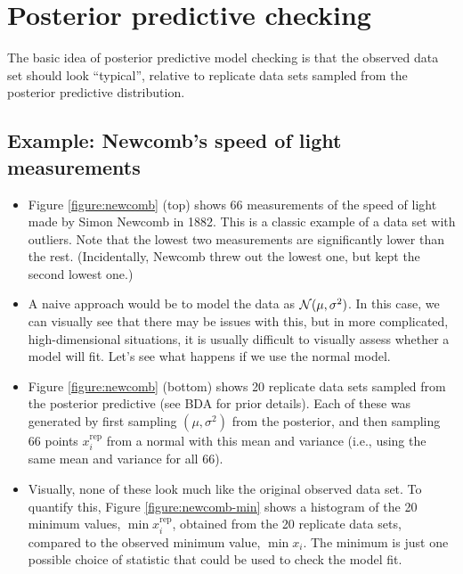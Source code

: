\documentclass[12pt]{article}
\begin{document}
\section{Posterior predictive checking}

The basic idea of  posterior predictive model checking is that the observed data set should look ``typical'', relative to replicate data sets sampled from the posterior predictive distribution.

\subsection*{Example: Newcomb's speed of light measurements}
\begin{itemize}
\item Figure \ref{figure:newcomb} (top) shows  66 measurements of the speed of light made by Simon Newcomb in 1882. This is a classic example of a data set with outliers. Note that the lowest two measurements are significantly lower than the rest. (Incidentally, Newcomb threw out the lowest one, but kept the second lowest one.)
\item A naive approach would be to model the data as $\mathcal{N}(\mu,\sigma^2)$. In this case, we can visually see that there may be issues with this, but in more complicated, high-dimensional situations, it is usually difficult to visually assess whether a model will fit. Let's see what happens if we use the normal model.
\item Figure \ref{figure:newcomb} (bottom) shows 20 replicate data sets sampled from the posterior predictive (see BDA for prior details).  Each of these was generated by first sampling $(\mu,\sigma^2)$ from the posterior, and then sampling 66 points $x_i^\text{rep}$ from a normal with this mean and variance (i.e., using the same mean and variance for all 66).
\item Visually, none of these look much like the original observed data set. To quantify this, Figure \ref{figure:newcomb-min} shows a histogram of the 20 minimum values, $\min x_i^\text{rep}$, obtained from the 20 replicate data sets, compared to the observed minimum value, $\min x_i$. The minimum is just one possible choice of statistic that could be used to check the model fit.
\end{itemize}
\end{document}
